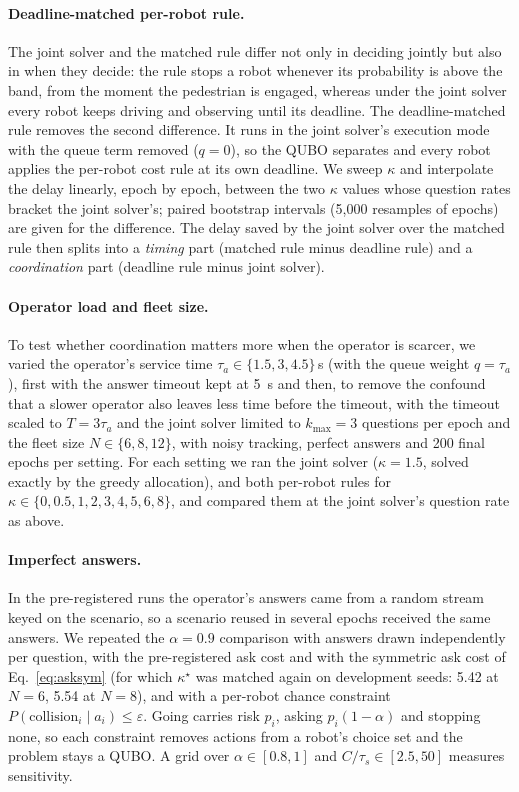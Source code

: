 \documentclass[a4paper,fleqn]{cas-dc}
\begin{document}
\paragraph{Deadline-matched per-robot rule.} The joint solver and the matched rule differ not only in deciding jointly but also in when they decide: the rule stops a robot whenever its probability is above the band, from the moment the pedestrian is engaged, whereas under the joint solver every robot keeps driving and observing until its deadline. The deadline-matched rule removes the second difference. It runs in the joint solver's execution mode with the queue term removed ($q = 0$), so the QUBO separates and every robot applies the per-robot cost rule at its own deadline. We sweep $\kappa$ and interpolate the delay linearly, epoch by epoch, between the two $\kappa$ values whose question rates bracket the joint solver's; paired bootstrap intervals (5{,}000 resamples of epochs) are given for the difference. The delay saved by the joint solver over the matched rule then splits into a \emph{timing} part (matched rule minus deadline rule) and a \emph{coordination} part (deadline rule minus joint solver).

\paragraph{Operator load and fleet size.} To test whether coordination matters more when the operator is scarcer, we varied the operator's service time $\tau_a \in \{1.5, 3, 4.5\}$\,s (with the queue weight $q = \tau_a$), first with the answer timeout kept at \SI{5}{s} and then, to remove the confound that a slower operator also leaves less time before the timeout, with the timeout scaled to $T = 3\tau_a$ and the joint solver limited to $k_{\max} = 3$ questions per epoch and the fleet size $N \in \{6, 8, 12\}$, with noisy tracking, perfect answers and 200 final epochs per setting. For each setting we ran the joint solver ($\kappa = 1.5$, solved exactly by the greedy allocation), and both per-robot rules for $\kappa \in \{0, 0.5, 1, 2, 3, 4, 5, 6, 8\}$, and compared them at the joint solver's question rate as above.

\paragraph{Imperfect answers.} In the pre-registered runs the operator's answers came from a random stream keyed on the scenario, so a scenario reused in several epochs received the same answers. We repeated the $\alpha = 0.9$ comparison with answers drawn independently per question, with the pre-registered ask cost and with the symmetric ask cost of Eq.~\eqref{eq:asksym} (for which $\kappa^\star$ was matched again on development seeds: 5.42 at $N = 6$, 5.54 at $N = 8$), and with a per-robot chance constraint $P(\text{collision}_i \mid a_i) \le \varepsilon$. Going carries risk $p_i$, asking $p_i(1-\alpha)$ and stopping none, so each constraint removes actions from a robot's choice set and the problem stays a QUBO. A grid over $\alpha \in [0.8, 1]$ and $C/\tau_s \in [2.5, 50]$ measures sensitivity.
\end{document}
